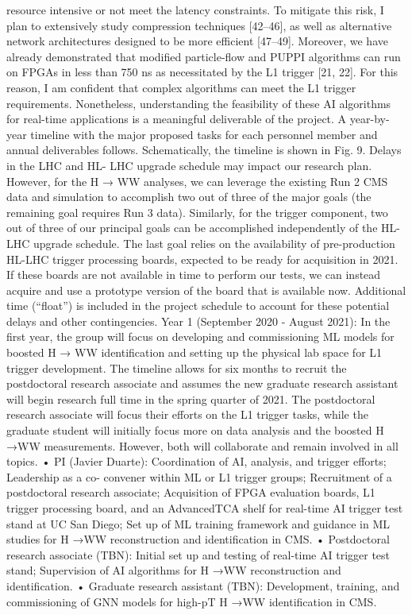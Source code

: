resource intensive or not meet the latency constraints. To mitigate this risk, I plan to extensively
study compression techniques [42–46], as well as alternative network architectures designed to
be more efficient [47–49]. Moreover, we have already demonstrated that modified particle-flow
and PUPPI algorithms can run on FPGAs in less than 750 ns as necessitated by the L1 trigger [21,
22]. For this reason, I am confident that complex algorithms can meet the L1 trigger requirements.
Nonetheless, understanding the feasibility of these AI algorithms for real-time applications is a
meaningful deliverable of the project.
A year-by-year timeline with the major proposed tasks for each personnel member and annual
deliverables follows. Schematically, the timeline is shown in Fig. 9. Delays in the LHC and HL-
LHC upgrade schedule may impact our research plan. However, for the H → WW analyses, we
can leverage the existing Run 2 CMS data and simulation to accomplish two out of three of the
major goals (the remaining goal requires Run 3 data). Similarly, for the trigger component, two
out of three of our principal goals can be accomplished independently of the HL-LHC upgrade
schedule. The last goal relies on the availability of pre-production HL-LHC trigger processing
boards, expected to be ready for acquisition in 2021. If these boards are not available in time to
perform our tests, we can instead acquire and use a prototype version of the board that is available
now. Additional time (“float”) is included in the project schedule to account for these potential
delays and other contingencies.
Year 1 (September 2020 - August 2021): In the first year, the group will focus on developing and
commissioning ML models for boosted H → WW identification and setting up the physical lab
space for L1 trigger development. The timeline allows for six months to recruit the postdoctoral
research associate and assumes the new graduate research assistant will begin research full time
in the spring quarter of 2021. The postdoctoral research associate will focus their efforts on the L1
trigger tasks, while the graduate student will initially focus more on data analysis and the boosted
H →WW measurements. However, both will collaborate and remain involved in all topics.
• PI (Javier Duarte): Coordination of AI, analysis, and trigger efforts; Leadership as a co-
convener within ML or L1 trigger groups; Recruitment of a postdoctoral research associate;
Acquisition of FPGA evaluation boards, L1 trigger processing board, and an AdvancedTCA
shelf for real-time AI trigger test stand at UC San Diego; Set up of ML training framework
and guidance in ML studies for H →WW reconstruction and identification in CMS.
• Postdoctoral research associate (TBN): Initial set up and testing of real-time AI trigger test
stand; Supervision of AI algorithms for H →WW reconstruction and identification.
• Graduate research assistant (TBN): Development, training, and commissioning of GNN
models for high-pT H →WW identification in CMS.

